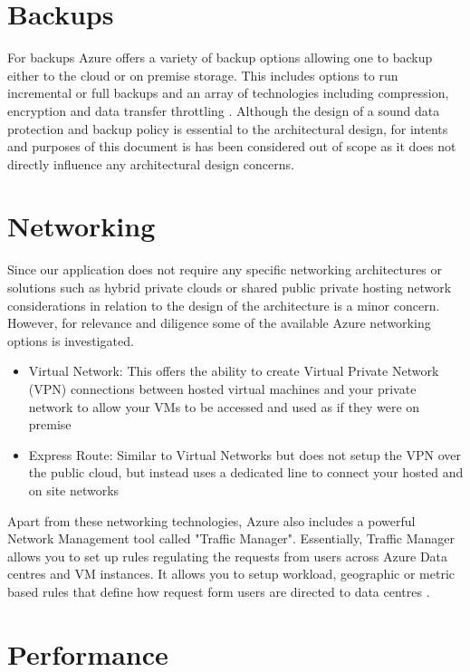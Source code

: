 \section{Backups}

For backups Azure offers a variety of backup options allowing one to backup either to the cloud or on premise storage. This includes options to run incremental or full backups and an array of technologies including compression, encryption and data transfer throttling \cite{Microsoft_Corporation_undated-ej}.  Although the design of a sound data protection and backup policy is essential to the architectural design, for intents and purposes of this document is has been considered out of scope as it does not directly influence any architectural design concerns. 

\section{Networking}

Since our application does not require any specific networking architectures or solutions such as hybrid private clouds or shared public private hosting network considerations in relation to the design of the architecture is a minor concern. However, for relevance and diligence some of the available Azure networking options is investigated.
 
\begin{itemize}
\item Virtual Network: This offers the ability to create Virtual Private Network (VPN) connections between hosted virtual machines and your private network to allow your VMs to be accessed and used as if they were on premise
\item Express Route: Similar to Virtual Networks but does not setup the VPN over the public cloud, but instead uses a dedicated line to connect your hosted and on site networks
\end{itemize}

Apart from these networking technologies, Azure also includes a powerful Network Management tool called "Traffic Manager". Essentially, Traffic Manager allows you to set up rules regulating the requests from users across Azure Data centres and VM instances. It allows you to setup workload, geographic or metric based rules that define how request form users are directed to data centres \cite{Microsoft_Corporation_undated-ej}.

\section{Performance}
